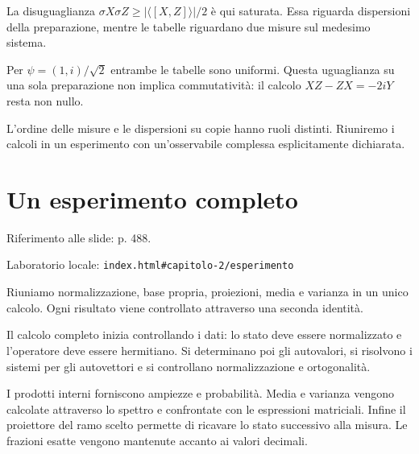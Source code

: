 La disuguaglianza \(\sigma X\sigma Z\ge |\langle [X,\allowbreak Z]\rangle |/2\) è qui saturata. Essa riguarda dispersioni della preparazione, mentre le tabelle riguardano due misure sul medesimo sistema.\par



Per \(\psi =(1,\allowbreak i)/\sqrt{2}\) entrambe le tabelle sono uniformi. Questa uguaglianza su una sola preparazione non implica commutatività: il calcolo \(XZ- ZX=- 2iY\) resta non nullo.\par


L'ordine delle misure e le dispersioni su copie hanno ruoli distinti. Riuniremo i calcoli in un esperimento con un'osservabile complessa esplicitamente dichiarata.\par


\Needspace{.43\textheight}
\section{Un esperimento completo}
\label{c2-esperimento}

{\sffamily\small\color{Ink!70} Riferimento alle slide: p. 488.\par}

{\sffamily\small\color{Ink!70} Laboratorio locale: \nolinkurl{index.html#capitolo-2/esperimento}\par}

Riuniamo normalizzazione, base propria, proiezioni, media e varianza in un unico calcolo. Ogni risultato viene controllato attraverso una seconda identità.\par

Il calcolo completo inizia controllando i dati: lo stato deve essere normalizzato e l'operatore deve essere hermitiano. Si determinano poi gli autovalori, si risolvono i sistemi per gli autovettori e si controllano normalizzazione e ortogonalità.\par

I prodotti interni forniscono ampiezze e probabilità. Media e varianza vengono calcolate attraverso lo spettro e confrontate con le espressioni matriciali. Infine il proiettore del ramo scelto permette di ricavare lo stato successivo alla misura. Le frazioni esatte vengono mantenute accanto ai valori decimali.\par



